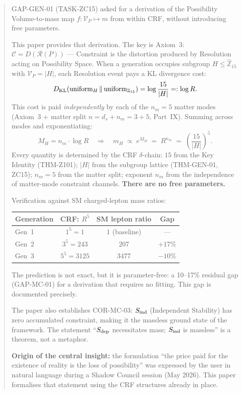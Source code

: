 \documentclass[12pt, a4paper]{article}
\begin{document}
\begin{abstract}
\sloppy
GAP-GEN-01 (TASK-ZC15) asked for a derivation of the Possibility
Volume-to-mass map $f: \mathcal{V}_P \mapsto m$ from within CRF,
without introducing free parameters.

This paper provides that derivation. The key is Axiom~3:
$\mathcal{C} = D(\mathcal{R}(P))$ --- Constraint is the distortion
produced by Resolution acting on Possibility Space. When a generation
occupies subgroup $H \leq \widehat{\mathbb{Z}}_{15}$ with
$\mathcal{V}_P = |H|$, each Resolution event pays a KL divergence
cost:
\[
  D_{\rm KL}\!\left(\text{uniform}_H \,\|\,
  \text{uniform}_{\mathbb{Z}_{15}}\right)
  = \log\frac{15}{|H|} =: \log R.
\]
This cost is paid \emph{independently} by each of the $n_m = 5$
matter modes (Axiom~3 + matter split $n = d_s + n_m = 3 + 5$,
Part~IX). Summing across modes and exponentiating:
\[
  M_H = n_m \cdot \log R
  \quad\Longrightarrow\quad
  m_H \;\propto\; e^{M_H} \;=\; R^{n_m}
  \;=\; \left(\frac{15}{|H|}\right)^5.
\]
Every quantity is determined by the CRF $\delta$-chain:
$15$ from the Key Identity (THM-Z101); $|H|$ from the subgroup
lattice (THM-GEN-01, ZC15); $n_m = 5$ from the matter split;
exponent $n_m$ from the independence of matter-mode constraint
channels. \textbf{There are no free parameters.}

Verification against SM charged-lepton mass ratios:

\medskip
\begin{center}
{\small
\begin{tabular}{lccc}
\toprule
Generation & CRF: $R^5$ & SM lepton ratio & Gap \\
\midrule
Gen~1 & $1^5 = 1$    & $1$ (baseline) & --- \\
Gen~2 & $3^5 = 243$  & $207$          & $+17\%$ \\
Gen~3 & $5^5 = 3125$ & $3477$         & $-10\%$ \\
\bottomrule
\end{tabular}
}
\end{center}
\medskip

The prediction is not exact, but it is parameter-free: a 10--17\%
residual gap (GAP-MC-01) for a derivation that requires no fitting.
This gap is documented precisely.

The paper also establishes COR-MC-03: $S_{\rm ind}$ (Independent
Stability) has zero accumulated constraint, making it the massless
ground state of the framework. The statement ``$S_{\rm dep}$
necessitates mass; $S_{\rm ind}$ is massless'' is a theorem, not
a metaphor.

\textbf{Origin of the central insight:} the formulation
``the price paid for the existence of reality is the loss of
possibility'' was expressed by the user in natural language
during a Shadow Council session (May 2026). This paper
formalises that statement using the CRF structures already in place.
\end{abstract}
\end{document}
